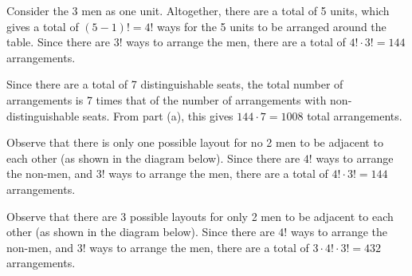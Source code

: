 \begin{solution}
    \begin{ppart}
        \begin{psubpart}
            Consider the 3 men as one unit. Altogether, there are a total of 5 units, which gives a total of $(5 - 1)! = 4!$ ways for the 5 units to be arranged around the table. Since there are $3!$ ways to arrange the men, there are a total of $4! \cdot 3! = 144$ arrangements.
        \end{psubpart}
        \begin{psubpart}
            Since there are a total of 7 distinguishable seats, the total number of arrangements is 7 times that of the number of arrangements with non-distinguishable seats. From part (a), this gives $144 \cdot 7 = 1008$ total arrangements.
        \end{psubpart}
    \end{ppart}
    \begin{ppart}
        Observe that there is only one possible layout for no 2 men to be adjacent to each other (as shown in the diagram below). Since there are $4!$ ways to arrange the non-men, and $3!$ ways to arrange the men, there are a total of $4! \cdot 3! = 144$ arrangements.

        \begin{center}
        \end{center}
    \end{ppart}
    \begin{ppart}
        Observe that there are 3 possible layouts for only 2 men to be adjacent to each other (as shown in the diagram below). Since there are $4!$ ways to arrange the non-men, and $3!$ ways to arrange the men, there are a total of $3 \cdot 4! \cdot 3! = 432$ arrangements.


\end{ppart}
\end{solution}
